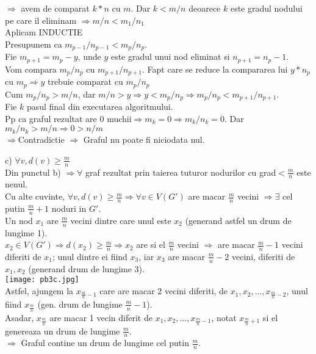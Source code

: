 \documentclass{article}
\begin{document}
$\Rightarrow$ avem de comparat $k*n$ cu $m$. Dar $k<m/n$ deoarece $k$ este gradul nodului pe care il eliminam $\Rightarrow m/n<m_{1}/ n_{1}$\\
Aplicam INDUCTIE\\
Presupunem ca $m_{p-1} / n_{p-1}<m_{p} / n_{p}$. \\
Fie $m_{p+1} = m_{p}-y$, unde $y$ este gradul unui nod eliminat si $n_{p+1}=n_{p}-1$.\\
Vom compara $m_{p}/n_{p}$ cu  $m_{p+1}/n_{p+1}$. Fapt care se reduce la compararea lui $y*n_{p}$ cu $m_{p}\Rightarrow y$ trebuie comparat cu $m_{p}/n_{p}$\\
Cum $m_{p}/n_{p}>m/n$, dar $m/n > y \Rightarrow y<m_{p}/n_{p} \Rightarrow m_{p}/n_{p} < m_{p+1}/n_{p+1}$.\\
Fie $k$ pasul final din executarea algoritmului.\\
Pp ca graful rezultat are 0 muchii$\Rightarrow m_{k}=0\Rightarrow m_{k} / n_{k}=0$. Dar $m_{k} / n_{k}>m/n \Rightarrow 0>n/m$ \\
$\Rightarrow$Contradictie $\Rightarrow$ Graful nu poate fi niciodata nul.

\bigskip
c)
$\forall v, d(v)\geq \frac{m}{n}$ \\
Din punctul b) $\Rightarrow \forall$ graf rezultat prin taierea tuturor nodurilor cu grad$ < \frac{m}{n}$ este nenul.\\
Cu alte cuvinte, $\forall v, d(v)\geq \frac{m}{n} \Rightarrow \forall v\in V(G')$ are macar $\frac{m}{n}$
 vecini $\Rightarrow \exists$ cel putin $\frac{m}{n} + 1$ noduri in $G'$.\\
 Un nod $x_{1}$ are $\frac{m}{n}$ vecini dintre care unul este $x_{2}$ (generand astfel un drum de lungime 1).\\
 $x_{2}\in V(G')\Rightarrow d(x_{2}) \geq \frac{m}{n} \Rightarrow x_{2}$ are si el $\frac{m}{n}$ vecini $\Rightarrow$ are macar $\frac{m}{n} - 1$ vecini diferiti de $x_{1}$; unul dintre ei fiind $x_{3}$, iar $x_{3}$ are macar $\frac{m}{n} - 2$ vecini, diferiti de $x_{1},x_{2}$ (generand drum de lungime 3).\\
\texttt{[image: pb3c.jpg]}\\
Astfel, ajungem la $x_{\frac{m}{n}-1}$ care are macar 2 vecini diferiti, de $x_{1},x_{2},...,x_{\frac{m}{n}-2}$, unul fiind $x_{\frac{m}{n}}$ (gen. drum de lungime $\frac{m}{n}-1$).\\
Asadar, $x_{\frac{m}{n}}$ are macar 1 vecin diferit de $x_{1},x_{2},...,x_{\frac{m}{n}-1}$, notat $x_{\frac{m}{n}+1}$ si el genereaza un drum de lungime $\frac{m}{n}$.\\
$\Rightarrow$ Graful contine un drum de lungime cel putin $\frac{m}{n}$.
\bigskip\\
\end{document}
